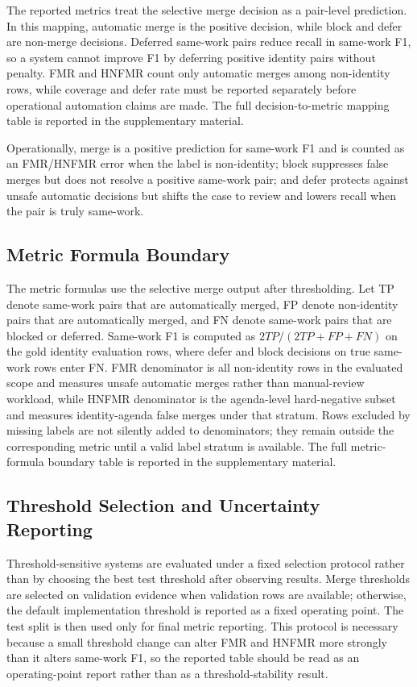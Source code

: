 \documentclass[preprint,12pt]{elsarticle}
\begin{document}
The reported metrics treat the selective merge decision as a pair-level prediction. In this mapping, automatic merge is the positive decision, while block and defer are non-merge decisions. Deferred same-work pairs reduce recall in same-work F1, so a system cannot improve F1 by deferring positive identity pairs without penalty. FMR and HNFMR count only automatic merges among non-identity rows, while coverage and defer rate must be reported separately before operational automation claims are made. The full decision-to-metric mapping table is reported in the supplementary material.

Operationally, merge is a positive prediction for same-work F1 and is counted as an FMR/HNFMR error when the label is non-identity; block suppresses false merges but does not resolve a positive same-work pair; and defer protects against unsafe automatic decisions but shifts the case to review and lowers recall when the pair is truly same-work.

\subsection{Metric Formula Boundary}

The metric formulas use the selective merge output after thresholding. Let TP denote same-work pairs that are automatically merged, FP denote non-identity pairs that are automatically merged, and FN denote same-work pairs that are blocked or deferred. Same-work F1 is computed as $2TP/(2TP+FP+FN)$ on the gold identity evaluation rows, where defer and block decisions on true same-work rows enter FN. FMR denominator is all non-identity rows in the evaluated scope and measures unsafe automatic merges rather than manual-review workload, while HNFMR denominator is the agenda-level hard-negative subset and measures identity-agenda false merges under that stratum. Rows excluded by missing labels are not silently added to denominators; they remain outside the corresponding metric until a valid label stratum is available. The full metric-formula boundary table is reported in the supplementary material.

\subsection{Threshold Selection and Uncertainty Reporting}

Threshold-sensitive systems are evaluated under a fixed selection protocol rather than by choosing the best test threshold after observing results. Merge thresholds are selected on validation evidence when validation rows are available; otherwise, the default implementation threshold is reported as a fixed operating point. The test split is then used only for final metric reporting. This protocol is necessary because a small threshold change can alter FMR and HNFMR more strongly than it alters same-work F1, so the reported table should be read as an operating-point report rather than as a threshold-stability result.
\end{document}
